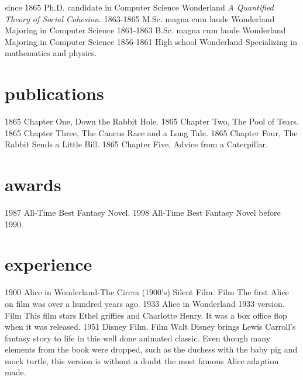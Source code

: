\documentclass[]{twentysecondcv}
\begin{document}
\begin{twenty}
  \twentyitem
    {since 1865}
    {Ph.D. {\normalfont candidate in Computer Science}}
    {Wonderland}
    {\emph{A Quantified Theory of Social Cohesion.}}
  \twentyitem
    {1863-1865}
    {M.Sc. magna cum laude}
    {Wonderland}
    {Majoring in Computer Science}
  \twentyitem
    {1861-1863}
    {B.Sc. magna cum laude}
    {Wonderland}
    {Majoring in Computer Science}
  \twentyitem
    {1856-1861}
    {High school}
    {Wonderland}
    {Specializing in mathematics and physics.}
\end{twenty}


\section{publications}

\begin{twentyshort}
  \twentyitemshort
    {1865}
    {Chapter One, Down the Rabbit Hole.}
  \twentyitemshort
    {1865}
    {Chapter Two, The Pool of Tears.}
  \twentyitemshort
    {1865}
    {Chapter Three,  The Caucus Race and a Long Tale.}
  \twentyitemshort
    {1865}
    {Chapter Four,  The Rabbit Sends a Little Bill.}
  \twentyitemshort
    {1865}
    {Chapter Five,  Advice from a Caterpillar.}
\end{twentyshort}



\section{awards}

\begin{twentyshort}
  \twentyitemshort
    {1987}
    {All-Time Best Fantasy Novel.}
  \twentyitemshort
    {1998}
    {All-Time Best Fantasy Novel before 1990.}
\end{twentyshort}


\section{experience}

\begin{twenty}
  \twentyitem
    {1900}
    {Alice in Wonderland-The Circra (1900's) Silent Film.}
    {Film}
    {The first Alice on film was over a hundred years ago.}
  \twentyitem
    {1933}
    {Alice in Wonderland 1933 version.}
    {Film}
    {This film stars Ethel griffies and Charlotte Henry. It was a box office flop when it was released.}
\twentyitem
    {1951}
    {Disney Film.}
    {Film}
    {Walt Disney brings Lewis Carroll's fantasy story to life in this well done animated classic. Even though many elements from the book were dropped, such as the duchess with the baby pig and mock turtle, this version is without a doubt the most famous Alice adaption made.}

\end{twenty}
\end{document}
